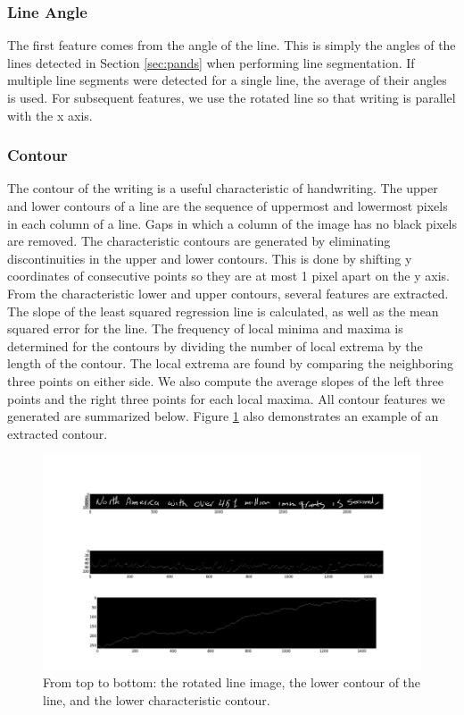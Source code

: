 \documentclass[paper=a4, fontsize=11pt]{scrartcl} %
\numberwithin{equation}{section} %
\numberwithin{figure}{section} %
\numberwithin{table}{section} %
\begin{document}
\subsubsection{Line Angle}
The first feature comes from the angle of the line. This is simply the
angles of the lines detected in Section \ref{sec:pands} when
performing line segmentation. If multiple line segments were detected
for a single line, the average of their angles is used. For subsequent
features, we use the rotated line so that writing is parallel with the
x axis.

\subsubsection{Contour}
The contour of the writing is a useful characteristic of
handwriting. The upper and lower contours of a line are the sequence
of uppermost and lowermost pixels in each column of a line. Gaps in
which a column of the image has no black pixels are removed. The
characteristic contours are generated by eliminating discontinuities
in the upper and lower contours. This is done by shifting y
coordinates of consecutive points so they are at most 1 pixel apart on
the y axis. From the characteristic lower and upper contours, several
features are extracted. The slope of the least squared regression line
is calculated, as well as the mean squared error for the line. The
frequency of local minima and maxima is determined for the contours by
dividing the number of local extrema by the length of the contour. The
local extrema are found by comparing the neighboring three points on
either side. We also compute the average slopes of the left three
points and the right three points for each local maxima. All contour
features we generated are summarized below. Figure \ref{fig:contourimage} also demonstrates an example of an extracted contour.

\begin{figure}
  \includegraphics{contourimage.png}
\caption{From top to bottom: the rotated line image, the lower contour of the line, and the lower characteristic contour.}
\label{fig:contourimage}
\end{figure}
\end{document}
